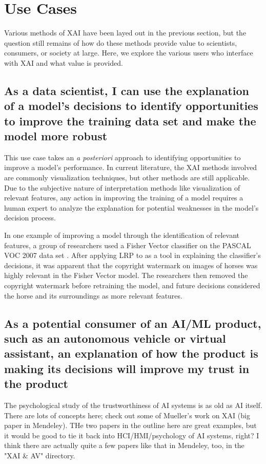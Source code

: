 \section{Use Cases} \label{sec:UseCases}

Various methods of XAI have been layed out in the previous section, but the question still remains of how do these methods provide value to scientists, consumers, or society at large.  Here, we explore the various users who interface with XAI and what value is provided.

\subsection{As a data scientist, I can use the explanation of a model's decisions to identify opportunities to improve the training data set and make the model more robust}\label{subsec:UseCase1}

This use case takes an \textit{a posteriori} approach to identifying opportunities to improve a model's performance.  In current literature, the XAI methods involved are commonly visualization techniques, but other methods are still applicable.  Due to the subjective nature of interpretation methods like visualization of relevant features, any action in improving the training of a model requires a human expert to analyze the explanation for potential weaknesses in the model's decision process.

In one example of improving a model through the identification of relevant features, a group of researchers used a Fisher Vector classifier on the PASCAL VOC 2007 data set \cite{Bach2016AnalyzingCF}.  After applying LRP to as a tool in explaining the classifier's decisions, it was apparent that the copyright watermark on images of horses was highly relevant in the Fisher Vector model.  The researchers then removed the copyright watermark before retraining the model, and future decisions considered the horse and its surroundings as more relevant features.

\subsection{As a potential consumer of an AI/ML product, such as an autonomous vehicle or virtual assistant, an explanation of how the product is making its decisions will improve my trust in the product}\label{subsec:UseCase2}

The psychological study of the trustworthiness of AI systems is as old as AI itself.  There are lots of concepts here; check out some of Mueller's work on XAI (big paper in Mendeley).  THe two papers in the outline here are great examples, but it would be good to tie it back into HCI/HMI/psychology of AI systems, right?  I think there are actually quite a few papers like that in Mendeley, too, in the "XAI \& AV" directory.

